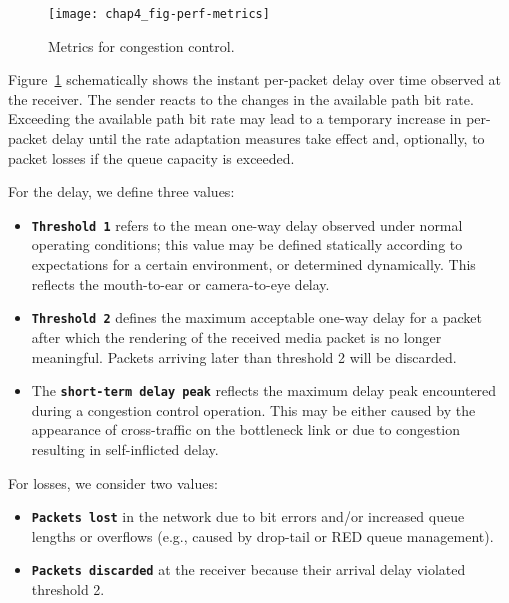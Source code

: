 


\begin{figure}[!t]
\centering
\texttt{[image: chap4\_fig-perf-metrics]}
\caption{Metrics for congestion control.}
\label{fig:4:rc_model}
\end{figure}

Figure~\ref{fig:4:rc_model} schematically shows the instant per-packet delay
over time observed at the receiver. The sender reacts to the changes in the
available path bit rate. Exceeding the available path bit rate may lead to a
temporary increase in per-packet delay until the rate adaptation measures take
effect and, optionally, to packet losses if the queue capacity is exceeded.

For the delay, we define three values:
\begin{itemize}
\setlength{\itemsep}{0pt}

\item \textbf{\texttt{Threshold 1}} refers to the mean one-way delay observed
under normal operating conditions; this value may be defined statically
according to expectations for a certain environment, or determined
dynamically. This reflects the mouth-to-ear or camera-to-eye delay.

\item \textbf{\texttt{Threshold 2}} defines the maximum acceptable one-way
delay for a packet after which the rendering of the received media packet is
no longer meaningful. Packets arriving later than threshold 2 will be
discarded.


\item The \textbf{\texttt{short-term delay peak}} reflects the maximum delay
peak encountered during a congestion control operation. This may be either
caused by the appearance of cross-traffic on the bottleneck link or due to
congestion resulting in self-inflicted delay.

\end{itemize}

For losses, we consider two values:
\begin{itemize}
\setlength{\itemsep}{0pt}

\item \textbf{\texttt{Packets lost}} in the network due to bit errors and/or
increased queue lengths or overflows (e.g., caused by drop-tail or RED queue
management).

\item \textbf{\texttt{Packets discarded}} at the receiver because their
arrival delay violated threshold 2.

\end{itemize}

